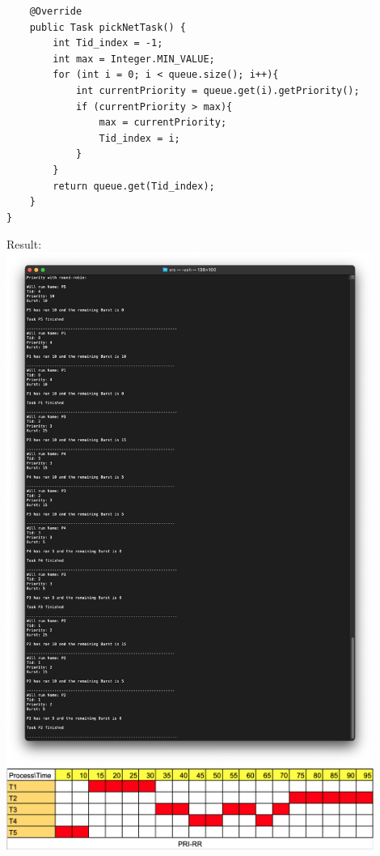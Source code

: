 \documentclass[12pt]{article}
\newenvironment{sol}[1][Solution]{\begin{trivlist}\item[\hskip\labelsep {\bfseries #1:}]}{\end{trivlist}}
\begin{document}
\begin{enumerate}
\begin{sol}
\begin{enumerate}
\begin{verbatim}
    @Override
    public Task pickNetTask() {
        int Tid_index = -1;
        int max = Integer.MIN_VALUE;
        for (int i = 0; i < queue.size(); i++){
            int currentPriority = queue.get(i).getPriority();
            if (currentPriority > max){
                max = currentPriority;
                Tid_index = i;
            }
        }
        return queue.get(Tid_index);
    }
}
    \end{verbatim}
        Result:\\
    \includegraphics[width=0.9\textwidth]{a5.png}
    \includegraphics[width=0.9\textwidth]{P5.png}
    

\end{enumerate}
\end{sol}
\end{enumerate}
\end{document}
